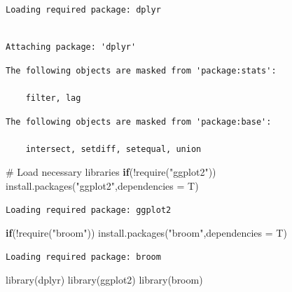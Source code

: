 \documentclass[
  letterpaper,
  DIV=11,
  numbers=noendperiod]{scrreprt}
\newenvironment{Shaded}{\begin{snugshade}}{\end{snugshade}}
\newcommand{\AttributeTok}[1]{\textcolor[rgb]{0.40,0.45,0.13}{#1}}
\newcommand{\CommentTok}[1]{\textcolor[rgb]{0.37,0.37,0.37}{#1}}
\newcommand{\ControlFlowTok}[1]{\textcolor[rgb]{0.00,0.23,0.31}{\textbf{#1}}}
\newcommand{\FunctionTok}[1]{\textcolor[rgb]{0.28,0.35,0.67}{#1}}
\newcommand{\NormalTok}[1]{\textcolor[rgb]{0.00,0.23,0.31}{#1}}
\newcommand{\SpecialCharTok}[1]{\textcolor[rgb]{0.37,0.37,0.37}{#1}}
\newcommand{\StringTok}[1]{\textcolor[rgb]{0.13,0.47,0.30}{#1}}
\begin{document}
\begin{verbatim}
Loading required package: dplyr
\end{verbatim}

\begin{verbatim}

Attaching package: 'dplyr'
\end{verbatim}

\begin{verbatim}
The following objects are masked from 'package:stats':

    filter, lag
\end{verbatim}

\begin{verbatim}
The following objects are masked from 'package:base':

    intersect, setdiff, setequal, union
\end{verbatim}

\begin{Shaded}
\begin{Highlighting}[]
\CommentTok{\# Load necessary libraries }
\ControlFlowTok{if}\NormalTok{(}\SpecialCharTok{!}\FunctionTok{require}\NormalTok{(}\StringTok{"ggplot2"}\NormalTok{))}
  \FunctionTok{install.packages}\NormalTok{(}\StringTok{"ggplot2"}\NormalTok{,}\AttributeTok{dependencies =}\NormalTok{ T)}
\end{Highlighting}
\end{Shaded}

\begin{verbatim}
Loading required package: ggplot2
\end{verbatim}

\begin{Shaded}
\begin{Highlighting}[]
\ControlFlowTok{if}\NormalTok{(}\SpecialCharTok{!}\FunctionTok{require}\NormalTok{(}\StringTok{"broom"}\NormalTok{))}
  \FunctionTok{install.packages}\NormalTok{(}\StringTok{"broom"}\NormalTok{,}\AttributeTok{dependencies =}\NormalTok{ T)}
\end{Highlighting}
\end{Shaded}

\begin{verbatim}
Loading required package: broom
\end{verbatim}

\begin{Shaded}
\begin{Highlighting}[]
\FunctionTok{library}\NormalTok{(dplyr) }
\FunctionTok{library}\NormalTok{(ggplot2)}
\FunctionTok{library}\NormalTok{(broom)}
\end{Highlighting}
\end{Shaded}
\end{document}
